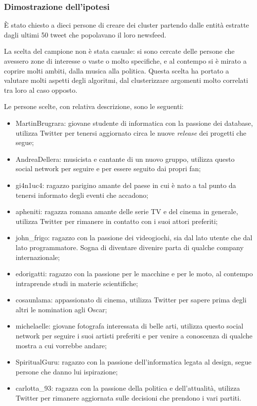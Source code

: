 \subsubsection{Dimostrazione dell'ipotesi}
È stato chiesto a dieci persone di creare dei cluster partendo dalle entità estratte dagli ultimi 50 tweet che popolavano il loro newsfeed.

La scelta del campione non è stata casuale: si sono cercate delle persone che avessero zone di interesse o vaste o molto specifiche, e al contempo si è mirato a coprire molti ambiti, dalla musica alla politica. Questa scelta ha portato a valutare molti aspetti degli algoritmi, dal clusterizzare argomenti molto correlati tra loro al caso opposto. 

Le persone scelte, con relativa descrizione, sono le seguenti:
\begin{itemize}
	\item MartinBrugrara: giovane studente di informatica con la passione dei database, utilizza Twitter per tenersi aggiornato circa le nuove \emph{release} dei progetti che segue;
	\item AndreaDellera: musicista e cantante di un nuovo gruppo, utilizza questo social network per seguire e per essere seguito dai propri fan;
	\item gi4n1uc4: ragazzo parigino amante del paese in cui è nato a tal punto da tenersi informato degli eventi che accadono;
	\item apheniti: ragazza romana amante delle serie TV e del cinema in generale, utilizza Twitter per rimanere in contatto con i suoi attori preferiti;
	\item john\_frigo: ragazzo con la passione dei videogiochi, sia dal lato utente che dal lato programmatore. Sogna di diventare divenire parta di qualche company internazionale;
	\item edorigatti: ragazzo con la passione per le macchine e per le moto, al contempo intraprende studi in materie scientifiche;
	\item cosaunlama: appassionato di cinema, utilizza Twitter per sapere prima degli altri le nomination agli Oscar;
	\item michelaelle: giovane fotografa interessata di belle arti, utilizza questo social network per seguire i suoi artisti preferiti e per venire a conoscenza di qualche mostra a cui vorrebbe andare; 
	\item SpiritualGuru: ragazzo con la passione dell'informatica legata al design, segue persone che danno lui ispirazione;
	\item carlotta\_93: ragazza con la passione della politica e dell'attualità, utilizza Twitter per rimanere aggiornata sulle decisioni che prendono i vari partiti.
\end{itemize}

